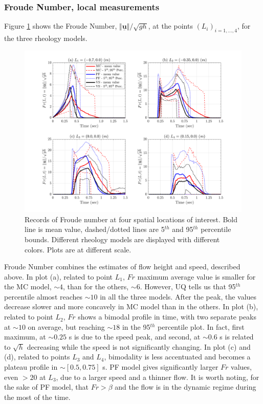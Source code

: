 \documentclass{article}
\begin{document}
\subsubsection{Froude Number, local measurements}
Figure \ref{fig:Ramp-Fr} shows the Froude Number, $\Vert \underline{\mathbf{u}} \Vert/\sqrt{gh}$, at the points $(L_i)_{i=1,\dots,4}$, for the three rheology models.
\begin{figure}[H]
         \centering
        \includegraphics[width=1\textwidth]{NewTest/Froude.png}
        \caption{Records of Froude number at four spatial locations of interest. Bold line is mean value, dashed/dotted lines are 5$^{th}$ and 95$^{th}$ percentile bounds. Different rheology models are displayed with different colors. Plots are at different scale.}
        \label{fig:Ramp-Fr}
\end{figure}
Froude Number combines the estimates of flow height and speed, described above. In plot (a), related to point $L_1$, $Fr$ maximum average value is smaller for the MC model, $\sim 4$, than for the others, $\sim 6$. However, UQ tells us that 95$^{th}$ percentile almost reaches $\sim 10$ in all the three models. After the peak, the values decrease slower and more concavely in MC model than in the others. In plot (b), related to point $L_2$, $Fr$ shows a bimodal profile in time, with two separate peaks at $\sim 10$ on average, but reaching $\sim 18$ in the 95$^{th}$ percentile plot. In fact, first maximum, at $\sim 0.25$ s is due to the speed peak, and second, at $\sim 0.6$ s is related to $\sqrt{h}$ decreasing while the speed is not significantly changing. In plot (c) and (d), related to points $L_3$ and $L_4$, bimodality is less accentuated and becomes a plateau profile in $\sim [0.5, 0.75]$ s. PF model gives significantly larger $Fr$ values, even $>20$ at $L_3$, due to a larger speed and a thinner flow. It is worth noting, for the sake of PF model, that $Fr>\beta$ and the flow is in the dynamic regime during the most of the time.
\end{document}
